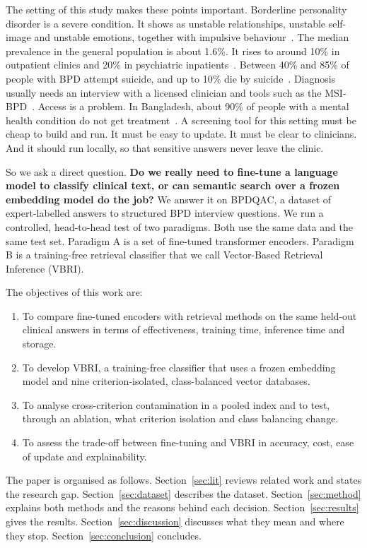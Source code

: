 \documentclass[11pt]{article}
\newcommand{\vbri}{VBRI}
\newcommand{\bpdqac}{BPDQAC}
\begin{document}
The setting of this study makes these points important. Borderline personality disorder is a severe
condition. It shows as unstable relationships, unstable self-image and unstable emotions, together
with impulsive behaviour~\cite{dsm}. The median prevalence in the general population is about 1.6\%.
It rises to around 10\% in outpatient clinics and 20\% in psychiatric inpatients~\cite{dsm}. Between
40\% and 85\% of people with BPD attempt suicide, and up to 10\% die by
suicide~\cite{paris2001,stone1990,oumaya2008}. Diagnosis usually needs an interview with a licensed
clinician and tools such as the MSI-BPD~\cite{zanarini2003}. Access is a problem. In Bangladesh,
about 90\% of people with a mental health condition do not get treatment~\cite{huque2025}. A
screening tool for this setting must be cheap to build and run. It must be easy to update. It must
be clear to clinicians. And it should run locally, so that sensitive answers never leave the clinic.

So we ask a direct question. \textbf{Do we really need to fine-tune a language model to classify
clinical text, or can semantic search over a frozen embedding model do the job?} We answer it on
\bpdqac{}, a dataset of expert-labelled answers to structured BPD interview questions. We run a
controlled, head-to-head test of two paradigms. Both use the same data and the same test set.
Paradigm A is a set of fine-tuned transformer encoders. Paradigm B is a training-free retrieval
classifier that we call Vector-Based Retrieval Inference (\vbri{}).

The objectives of this work are:
\begin{enumerate}[leftmargin=*,itemsep=2pt]
  \item To compare fine-tuned encoders with retrieval methods on the same held-out clinical answers
        in terms of effectiveness, training time, inference time and storage.
  \item To develop \vbri{}, a training-free classifier that uses a frozen embedding model and nine
        criterion-isolated, class-balanced vector databases.
  \item To analyse cross-criterion contamination in a pooled index and to test, through an ablation,
        what criterion isolation and class balancing change.
  \item To assess the trade-off between fine-tuning and \vbri{} in accuracy, cost, ease of update
        and explainability.
\end{enumerate}

The paper is organised as follows. Section~\ref{sec:lit} reviews related work and states the
research gap. Section~\ref{sec:dataset} describes the dataset. Section~\ref{sec:method} explains
both methods and the reasons behind each decision. Section~\ref{sec:results} gives the results.
Section~\ref{sec:discussion} discusses what they mean and where they stop. Section~\ref{sec:conclusion}
concludes.
\end{document}
